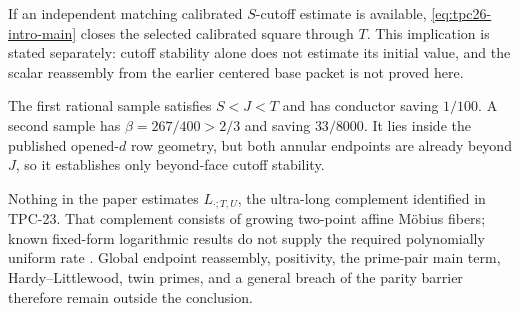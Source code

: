 If an independent matching calibrated \(S\)-cutoff estimate is
available, \eqref{eq:tpc26-intro-main} closes the selected calibrated
square through \(T\).  This implication is stated separately: cutoff
stability alone does not estimate its initial value, and the scalar
reassembly from the earlier centered base packet is not proved here.

The first rational sample satisfies \(S<J<T\) and has conductor saving
\(1/100\).  A second sample has \(\beta=267/400>2/3\) and saving
\(33/8000\).  It lies inside the published opened-\(d\) row geometry,
but both annular endpoints are already beyond \(J\), so it establishes
only beyond-face cutoff stability.

Nothing in the paper estimates \(L_{\cdot;T,U}\), the ultra-long
complement identified in TPC-23.  That complement consists of growing
two-point affine M\"obius fibers; known fixed-form logarithmic results
do not supply the required polynomially uniform rate
\citep{Tao2016,WangTPC23}.  Global endpoint reassembly, positivity,
the prime-pair main term, Hardy--Littlewood, twin primes, and a general
breach of the parity barrier therefore remain outside the conclusion.
